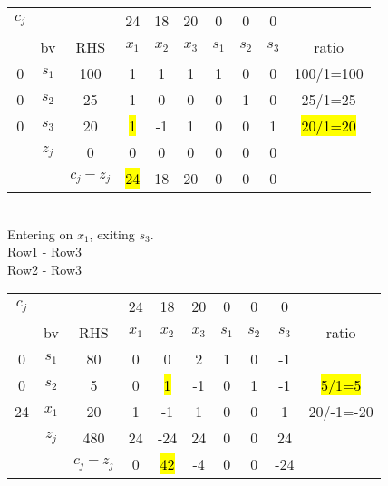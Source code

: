 \documentclass[answers]{exam}
\begin{document}
\begin{tabular}{cccccccccc}
	$c_j$                  &                            &                                & 24    & 18    & 20    & 0     & 0     & 0     &           \\
	\multicolumn{1}{c|}{}  & \multicolumn{1}{c|}{bv}    & \multicolumn{1}{c|}{RHS}       & $x_1$ & $x_2$ & $x_3$ & $s_1$ & $s_2$ & $s_3$ & ratio     \\ \cline{1-9}
	\multicolumn{1}{c|}{0} & \multicolumn{1}{c|}{$s_1$} & \multicolumn{1}{c|}{100}       & 1     & 1     & 1     & 1     & 0     & 0     & 100/1=100 \\
	\multicolumn{1}{c|}{0} & \multicolumn{1}{c|}{$s_2$} & \multicolumn{1}{c|}{25}        & 1     & 0     & 0     & 0     & 1     & 0     & 25/1=25   \\
	\multicolumn{1}{c|}{0} & \multicolumn{1}{c|}{$s_3$} & \multicolumn{1}{c|}{20}        & \hl{1}     & -1    & 1     & 0     & 0     & 1     & \hl{20/1=20}   \\ \cline{1-9}
	& \multicolumn{1}{c|}{$z_j$} & \multicolumn{1}{c|}{0}         & 0     & 0     & 0     & 0     & 0     & 0     &           \\ \cline{3-9}
	&                            & \multicolumn{1}{c|}{$c_j-z_j$} & \hl{24}    & 18    & 20    & 0     & 0     & 0     &          
\end{tabular} \\

\noindent
Entering on $x_1$, exiting $s_3$. \\
Row1 - Row3 \\
Row2 - Row3 \\

\begin{tabular}{cccccccccc}
	$c_j$                   &                            &                                & 24    & 18    & 20    & 0     & 0     & 0     &           \\
	\multicolumn{1}{c|}{}   & \multicolumn{1}{c|}{bv}    & \multicolumn{1}{c|}{RHS}       & $x_1$ & $x_2$ & $x_3$ & $s_1$ & $s_2$ & $s_3$ & ratio     \\ \cline{1-9}
	\multicolumn{1}{c|}{0}  & \multicolumn{1}{c|}{$s_1$} & \multicolumn{1}{c|}{80}        & 0     & 0     & 2     & 1     & 0     & -1    &           \\
	\multicolumn{1}{c|}{0}  & \multicolumn{1}{c|}{$s_2$} & \multicolumn{1}{c|}{5}         & 0     & \hl{1}     & -1    & 0     & 1     & -1    & \hl{5/1=5 }    \\
	\multicolumn{1}{c|}{24} & \multicolumn{1}{c|}{$x_1$} & \multicolumn{1}{c|}{20}        & 1     & -1    & 1     & 0     & 0     & 1     & 20/-1=-20 \\ \cline{1-9}
	& \multicolumn{1}{c|}{$z_j$} & \multicolumn{1}{c|}{480}       & 24    & -24   & 24    & 0     & 0     & 24    &           \\ \cline{3-9}
	&                            & \multicolumn{1}{c|}{$c_j-z_j$} & 0     & \hl{42}    & -4    & 0     & 0     & -24   &          
\end{tabular} \\
\end{document}
